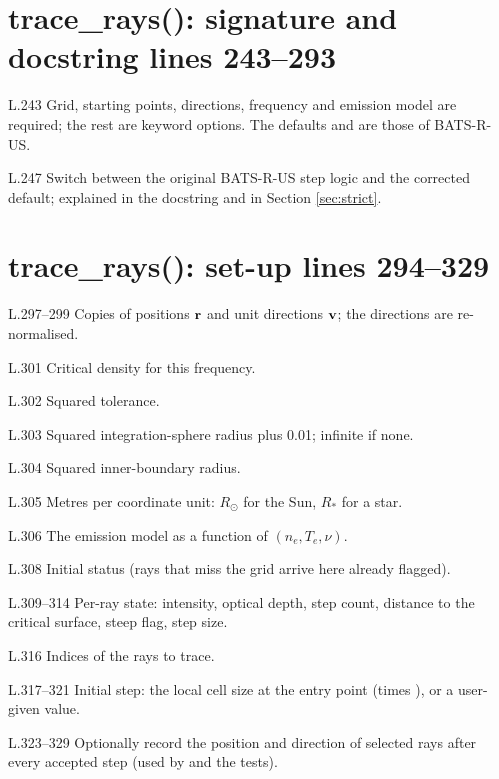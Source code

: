 \section*{\normalsize trace\_rays(): signature and docstring \hfill{\small\mdseries\color{gray}lines 243--293}}

\begin{lines}
\item[L.243] Grid, starting points, directions, frequency and emission model are required; the rest are keyword options. The defaults  and  are those of BATS-R-US.
\item[L.247] Switch between the original BATS-R-US step logic and the corrected default; explained in the docstring and in Section \ref{sec:strict}.
\end{lines}
\section*{\normalsize trace\_rays(): set-up \hfill{\small\mdseries\color{gray}lines 294--329}}

\begin{lines}
\item[L.297–299] Copies of positions $\mathbf{r}$ and unit directions $\mathbf{v}$; the directions are re-normalised.
\item[L.301] Critical density for this frequency.
\item[L.302] Squared tolerance.
\item[L.303] Squared integration-sphere radius plus 0.01; infinite if none.
\item[L.304] Squared inner-boundary radius.
\item[L.305] Metres per coordinate unit: $R_\odot$ for the Sun, $R_\ast$ for a star.
\item[L.306] The emission model as a function of $(n_e, T_e, \nu)$.
\item[L.308] Initial status (rays that miss the grid arrive here already flagged).
\item[L.309–314] Per-ray state: intensity, optical depth, step count, distance to the critical surface, steep flag, step size.
\item[L.316] Indices of the rays to trace.
\item[L.317–321] Initial step: the local cell size at the entry point (times ), or a user-given value.
\item[L.323–329] Optionally record the position and direction of selected rays after every accepted step (used by  and the tests).
\end{lines}
